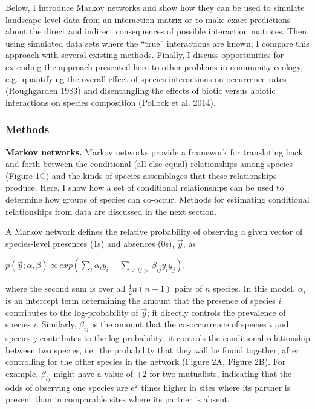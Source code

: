 \documentclass[12pt,]{article}
\begin{document}
\begin{spacing}{1.9}
\begin{flushleft}
Below, I introduce Markov networks and show how they can be used to
simulate landscape-level data from an interaction matrix or to make
exact predictions about the direct and indirect consequences of possible
interaction matrices. Then, using simulated data sets where the ``true''
interactions are known, I compare this approach with several existing
methods. Finally, I discuss opportunities for extending the approach
presented here to other problems in community ecology, e.g.~quantifying
the overall effect of species interactions on occurrence rates
(Roughgarden 1983) and disentangling the effects of biotic versus
abiotic interactions on species composition (Pollock et al. 2014).

\subsubsection{Methods}\label{methods}

\textbf{Markov networks.} Markov networks provide a framework for
translating back and forth between the conditional (all-else-equal)
relationships among species (Figure 1C) and the kinds of species
assemblages that these relationships produce. Here, I show how a set of
conditional relationships can be used to determine how groups of species
can co-occur. Methods for estimating conditional relationships from data
are discussed in the next section.

A Markov network defines the relative probability of observing a given
vector of species-level presences (1s) and absences (0s), \(\vec{y}\),
as

\centering

\(\displaystyle{p(\vec{y}; \alpha, \beta) \propto exp(\sum_{i}\alpha_i y_i + \sum_{<ij>}\beta_{ij}y_i y_j),}\)

\raggedright
\setlength{\parindent}{1cm}

\noindent where the second sum is over all \(\frac{1}{2}n(n-1)\) pairs
of \(n\) species. In this model, \(\alpha_{i}\) is an intercept term
determining the amount that the presence of species \(i\) contributes to
the log-probability of \(\vec{y}\); it directly controls the prevalence
of species \(i\). Similarly, \(\beta_{ij}\) is the amount that the
co-occurrence of species \(i\) and species \(j\) contributes to the
log-probability; it controls the conditional relationship between two
species, i.e.~the probability that they will be found together, after
controlling for the other species in the network (Figure 2A, Figure 2B).
For example, \(\beta_{ij}\) might have a value of \(+2\) for two
mutualists, indicating that the odds of observing one species are
\(e^2\) times higher in sites where its partner is present than in
comparable sites where its partner is absent.


\end{flushleft}
\end{spacing}
\end{document}
